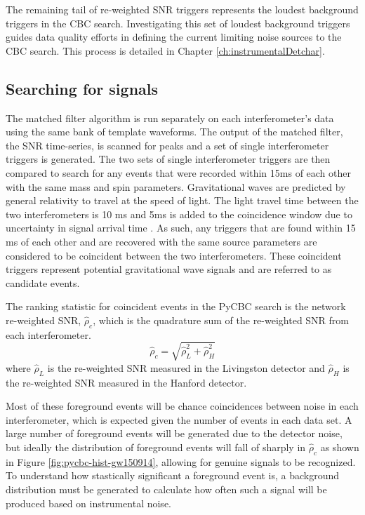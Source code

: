 The remaining tail of re-weighted SNR triggers represents the loudest 
background triggers in the CBC search. Investigating this set of
loudest background triggers guides data quality efforts in defining the current 
limiting noise sources to the CBC search. This process is detailed in Chapter 
\ref{ch:instrumentalDetchar}.

\subsection{Searching for signals}

The matched filter algorithm is run separately on each interferometer's data using the 
same bank 
of template waveforms. The output of the matched filter, the SNR time-series, is scanned 
for peaks and a set of single interferometer 
triggers is generated. The two sets of single interferometer triggers are then compared to
search for any events that were recorded within 15ms of each other with the same mass and 
spin parameters. 
Gravitational waves are predicted by general relativity to travel
at the speed of light. The light travel time between the two interferometers is 10 ms
and 5ms is added to the coincidence window due to uncertainty in signal arrival time
\cite{GW150914-CBC}.
As such, any triggers that are found within 15 ms of each other and
are recovered with the same source parameters are considered to be coincident between 
the two
interferometers. These coincident triggers represent potential gravitational wave signals
and are referred to as candidate events. 

The ranking statistic for coincident events in the PyCBC search is the network
re-weighted SNR, $\hat{\rho}_{c}$, which is the quadrature sum of the re-weighted
SNR from each interferometer.  
\begin{equation}
\hat{\rho}_{c} = \sqrt{\hat{\rho}^2_L + \hat{\rho}^2_H}
\end{equation}
where $\hat{\rho}_L$ is the re-weighted SNR measured in the Livingston detector 
and $\hat{\rho}_H$ is the re-weighted SNR measured in the Hanford detector.

Most of these foreground events will be
chance coincidences between noise in each interferometer, which is expected given
the number of events in each data set. A large number of foreground events will be 
generated due to the detector noise, but ideally the distribution of foreground events 
will fall of sharply in $\hat{\rho}_{c}$ as shown in Figure \ref{fig:pycbc-hist-gw150914}, 
allowing for genuine signals to be 
recognized. To understand how stastically significant a foreground event is, a background 
distribution must be generated to calculate how often such a signal will be produced based 
on instrumental noise.

